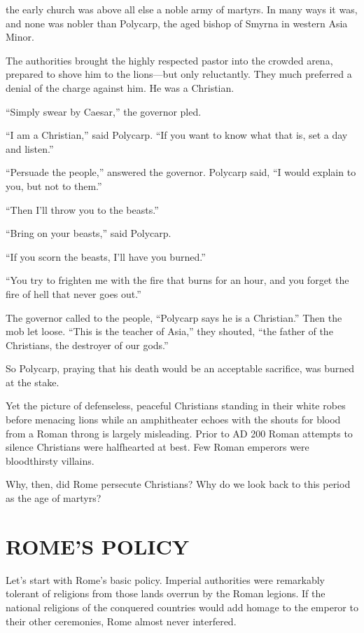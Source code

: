 
 the early church was above all else a noble army of martyrs. In many
ways it was, and none was nobler than Polycarp, the aged bishop of Smyrna in western Asia Minor.

The authorities brought the highly respected pastor into the crowded arena, prepared to shove him to
the lions—but only reluctantly. They much preferred a denial of the charge against him. He was a
Christian.

“Simply swear by Caesar,” the governor pled.

“I am a Christian,” said Polycarp. “If you want to know what that is, set a day and listen.”

“Persuade the people,” answered the governor. Polycarp said, “I would explain to you, but not to
them.”

“Then I’ll throw you to the beasts.”

“Bring on your beasts,” said Polycarp.

“If you scorn the beasts, I’ll have you burned.”

“You try to frighten me with the fire that burns for an hour, and you forget the fire of hell that
never goes out.”

The governor called to the people, “Polycarp says he is a Christian.” Then the mob let loose. “This
is the teacher of Asia,” they shouted, “the father of the Christians, the destroyer of our gods.”

So Polycarp, praying that his death would be an acceptable sacrifice, was burned at the stake.

Yet the picture of defenseless, peaceful Christians standing in their white robes before menacing
lions while an amphitheater echoes with the shouts for blood from a Roman throng is largely
misleading. Prior to AD 200 Roman attempts to silence Christians were halfhearted at best. Few Roman
emperors were bloodthirsty villains.

Why, then, did Rome persecute Christians? Why do we look back to this period as the age of martyrs?

\section{ROME’S POLICY}

Let’s start with Rome’s basic policy. Imperial authorities were remarkably tolerant of religions
from those lands overrun by the Roman legions. If the national religions of the conquered countries
would add homage to the emperor to their other ceremonies, Rome almost never interfered.

